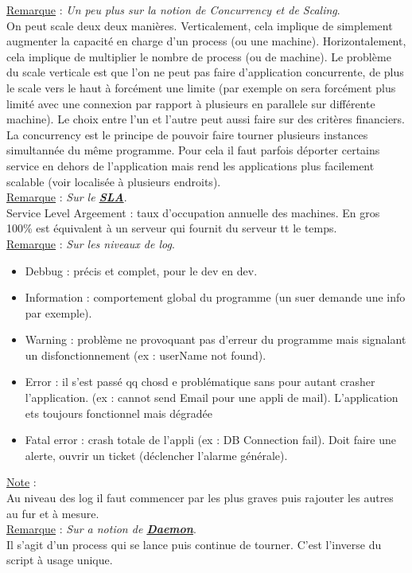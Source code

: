 \documentclass[a4paper,12pt,twoside]{article}
\newcommand{\urlcolor}{magenta}  %
\newcommand{\keycolor}{purple} %
\newcommand{\rem}[2]{\noindent\underline{Remarque} : \textit{#1}.\\ \indent #2}
\newcommand{\note}[1]{\noindent\underline{Note} : \\ \indent #1}
\newcommand{\keyref}[2]{\hypersetup{urlcolor=\keycolor} \href{#1}{\textbf{#2}}\hypersetup{urlcolor=\urlcolor}}
\begin{document}
\rem{Un peu plus sur la notion de Concurrency et de Scaling}{On peut scale deux deux manières. Verticalement, cela implique de simplement augmenter la capacité en charge d'un process (ou une machine). Horizontalement, cela implique de multiplier le nombre de process (ou de machine). Le problème du scale verticale est que l'on ne peut pas faire d'application concurrente, de plus le scale vers le haut à forcément une limite (par exemple on sera forcément plus limité avec une connexion par rapport à plusieurs en parallele sur différente machine). Le choix entre l'un et l'autre peut aussi faire sur des critères financiers. La concurrency est le principe de pouvoir faire tourner plusieurs instances simultannée du même programme. Pour cela il faut parfois déporter certains service en dehors de l'application mais rend les applications plus facilement scalable (voir localisée à plusieurs endroits).}\\

\rem{Sur le \keyref{https://fr.wikipedia.org/wiki/Service-level_agreement}{SLA}}{Service Level Argeement : taux d'occupation annuelle des machines. En gros 100\% est équivalent à un serveur qui fournit du serveur tt le temps.}\\

\rem{Sur les niveaux de log}{\begin{itemize} 
\item Debbug : précis et complet, pour le dev en dev. 
\item Information : comportement global du programme (un suer demande une info par exemple).
\item Warning : problème ne provoquant pas d'erreur du programme mais signalant un disfonctionnement (ex : userName not found).
\item Error : il s'est passé qq chosd e problématique sans pour autant crasher l'application. (ex : cannot send Email pour une appli de mail). L'application ets toujours fonctionnel mais dégradée
\item Fatal error : crash totale de l'appli (ex : DB Connection fail). Doit faire une alerte, ouvrir un ticket (déclencher l'alarme générale).\\
\end{itemize}}

\note{Au niveau des log il faut commencer par les plus graves puis rajouter les autres au fur et à mesure.}\\

\rem{Sur a notion de \keyref{https://fr.wikipedia.org/wiki/Daemon_(informatique)}{Daemon}}{Il s'agit d'un process qui se lance puis continue de tourner. C'est l'inverse du script à usage unique.}\\
\end{document}
